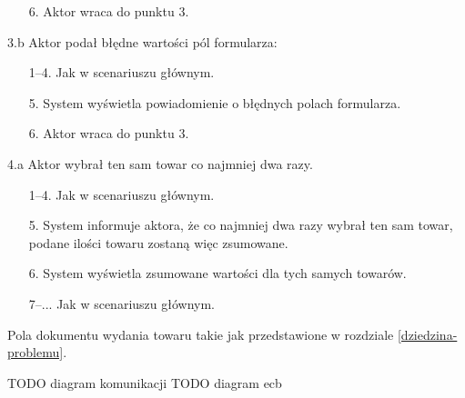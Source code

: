 \begin{usecase}
{\begin{enumerate}
        \item[6.] Aktor wraca do punktu 3.  
      \end{enumerate}
    \item [3.b] Aktor podał błędne wartości pól formularza:
      \begin{enumerate}
        \item[1--4.] Jak w scenariuszu głównym.
        \item[5.] System wyświetla powiadomienie o błędnych polach formularza.
        \item[6.] Aktor wraca do punktu 3.
      \end{enumerate}
     \item[4.a] Aktor wybrał ten sam towar co najmniej dwa razy.
       \begin{enumerate}
       \item[1--4.] Jak w scenariuszu głównym.
       \item[5.] System informuje aktora, że co najmniej dwa razy wybrał ten sam towar, podane ilości towaru zostaną więc zsumowane.
       \item[6.] System wyświetla zsumowane wartości dla tych samych towarów.
       \item[7--...] Jak w scenariuszu głównym.
       \end{enumerate}
  }
   {
    Pola dokumentu wydania towaru takie jak przedstawione w rozdziale \ref{dziedzina-problemu}.
  }
\end{usecase}
TODO diagram komunikacji TODO diagram ecb
